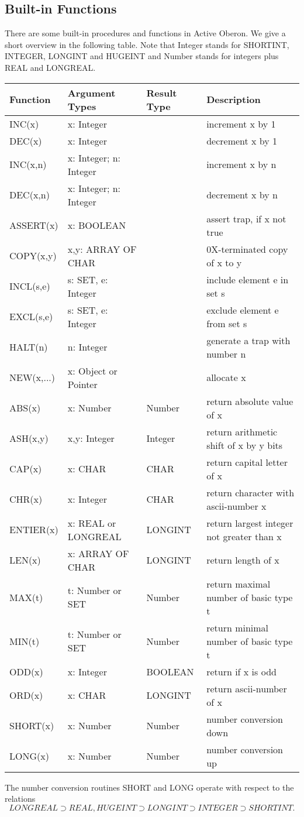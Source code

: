\documentclass[a4paper,11pt]{article}
\begin{document}
\subsection{Built-in Functions}
There are some built-in procedures and functions in Active Oberon. We give a short overview in the following table. Note that Integer stands for SHORTINT, INTEGER, LONGINT and HUGEINT and Number stands for integers plus REAL and LONGREAL.
\begin{longtable}{|p{2cm}|p{4.3cm}|p{1.95cm}|p{6cm}|}
\hline
Function & Argument Types & Result Type & Description \\
\hline\hline
\endhead
INC(x) & x: Integer &  & increment x by 1 \\
DEC(x) & x: Integer &  & decrement x by 1 \\
INC(x,n) & x: Integer; n: Integer &  & increment x by n \\
DEC(x,n) & x: Integer; n: Integer &  & decrement x by n \\
ASSERT(x) & x: BOOLEAN & & assert trap, if x not true \\
COPY(x,y) & x,y: ARRAY OF CHAR& & 0X-terminated copy of x to y \\
INCL(s,e) & s: SET, e: Integer & & include element e in set s \\
EXCL(s,e) & s: SET, e: Integer & & exclude element e from set s \\
HALT(n) & n: Integer & & generate a trap with number n \\
NEW(x,...) & x: Object or Pointer & & allocate x\\
ABS(x) & x: Number & Number & return absolute value of x\\
ASH(x,y) & x,y: Integer & Integer & return arithmetic shift of x by y bits\\
CAP(x) & x: CHAR & CHAR & return capital letter of x\\
CHR(x) & x: Integer & CHAR & return character with ascii-number x\\
ENTIER(x) & x: REAL or LONGREAL & LONGINT & return largest integer not greater than x\\
LEN(x) & x: ARRAY OF CHAR & LONGINT & return length of x\\
MAX(t) & t: Number or SET & Number & return maximal number of basic type t\\
MIN(t) & t: Number or SET & Number & return minimal number of basic type t\\
ODD(x) & x: Integer & BOOLEAN & return if x is odd\\
ORD(x) & x: CHAR & LONGINT & return ascii-number of x\\
SHORT(x) & x: Number & Number & number conversion down \\
LONG(x) & x: Number & Number & number conversion up \\
\hline
\end{longtable}
The number conversion routines SHORT and LONG operate with respect to the relations
$$LONGREAL \supset REAL, HUGEINT \supset LONGINT \supset INTEGER \supset SHORTINT.$$
\end{document}
